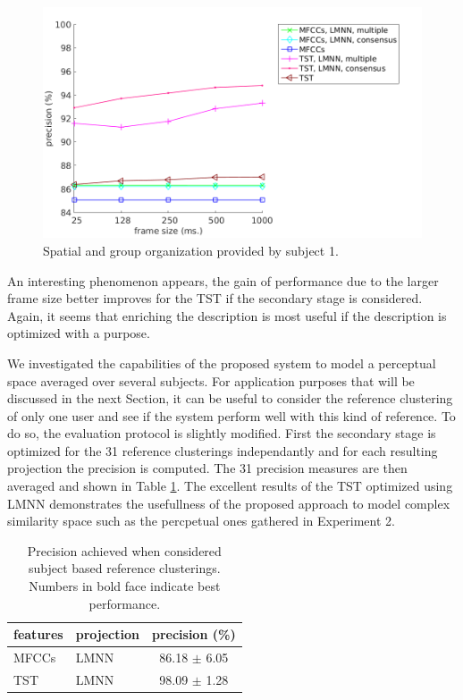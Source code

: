 \documentclass{article}
\begin{document}
\begin{figure}
\center
\includegraphics[width = \textwidth]{figures/frame.png}
\caption{Spatial and group organization provided by subject 1.}
\label{fig:frame}
\end{figure}

An interesting phenomenon appears, the gain of performance due to the larger frame size better improves for the TST if the secondary stage is considered. Again, it seems that enriching the description is most useful if the description is optimized with a purpose.

We investigated the capabilities of the proposed system to model a perceptual space averaged over several subjects. For application purposes that will be discussed in the next Section, it can be useful to consider the reference clustering of only one user and see if the system perform well with this kind of reference. To do so, the evaluation protocol is slightly modified. First the secondary stage is optimized for the 31 reference clusterings independantly and for each resulting projection the precision is computed. The 31 precision measures are then averaged and shown in Table \ref{tab:res2}. The excellent results of the TST optimized using LMNN demonstrates the usefullness of the proposed approach to model complex similarity space such as the percpetual ones gathered in Experiment 2.


\begin{table}
  \caption{Precision achieved when considered subject based reference clusterings. Numbers in bold face indicate best performance.}
  \label{tab:res2}
  \begin{center}
\begin{tabular}{llc}
features & projection & precision (\%) \\
  \hline
MFCCs & LMNN & 86.18 $\pm$ 6.05 \\
TST & LMNN & 98.09 $\pm$ 1.28 \\
\end{tabular}
\end{center}
\end{table}
\end{document}
